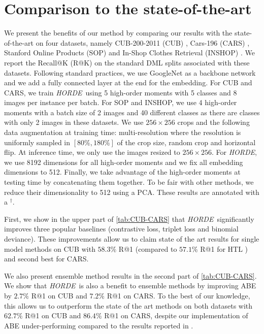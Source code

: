 \documentclass[10pt,twocolumn,letterpaper]{article}
\def\ourmethod{\textit{HORDE}}
\begin{document}
     

\section{Comparison to the state-of-the-art}\label{sec:sota}
    We present the benefits of our method by comparing our results with the state-of-the-art on four datasets, namely CUB-200-2011 (CUB) \cite{CUB_200_2011}, Cars-196 (CARS) \cite{CARS_196}, Stanford Online Products (SOP) \cite{Song_2016_CVPR} and In-Shop Clothes Retrieval (INSHOP) \cite{Liu_2016_CVPR_INSHOP}.
    We report the Recall@K (R@K) on the standard DML splits associated with these datasets.
    Following standard practices, we use GoogleNet \cite{Szegedy_2015_CVPR} as a backbone network and we add a fully connected layer at the end for the embedding.
For CUB and CARS, we train \ourmethod \ using 5 high-order moments with 5 classes and 8 images per instance per batch.
    For SOP and INSHOP, we use 4 high-order moments with a batch size of 2 images and 40 different classes as there are classes with only 2 images in these datasets.
    We use $256\times256$ crops and the following data augmentation at training time: multi-resolution where the resolution is uniformly sampled in $[80\%, 180\%]$ of the crop size, random crop and horizontal flip.
    At inference time, we only use the images resized to $256\times256$.
    For \ourmethod, we use 8192 dimensions for all high-order moments and we fix all embedding dimensions to 512.
    Finally, we take advantage of the high-order moments at testing time by concatenating them together.
    To be fair with other methods, we reduce their dimensionality to 512 using a PCA.
    These results are annotated with a $^\dag$.
    
    First, we show in the upper part of \autoref{tab:CUB-CARS} that \ourmethod \ significantly improves three popular baselines (contrastive loss, triplet loss and binomial deviance).
    These improvements allow us to claim state of the art results for single model methods on CUB with $\mathbf{58.3}$\% R@1 (compared to $57.1$\% R@1 for HTL \cite{Ge_2018_ECCV}) and second best for CARS.
    
    We also present ensemble method results in the second part of \autoref{tab:CUB-CARS}.
    We show that \ourmethod\ is also a benefit to ensemble methods by improving ABE \cite{Kim_2018_ECCV} by $2.7\%$ R@1 on CUB and $7.2\%$ R@1 on CARS.
    To the best of our knowledge, this allows us to outperform the state of the art methods on both datasets with $\mathbf{62.7}\%$ R@1 on CUB and $\mathbf{86.4}\%$ R@1 on CARS, despite our implementation of ABE under-performing compared to the results reported in \cite{Kim_2018_ECCV}.
    
\end{document}
